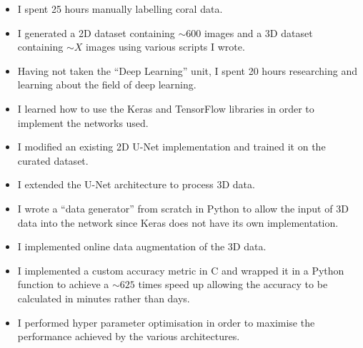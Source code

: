 \begin{itemize}
    \item I spent 25 hours manually labelling coral data.
    \item I generated a 2D dataset containing ${\sim}600$ images and a 3D dataset containing ${\sim}X$ images using various scripts I wrote.
    \item Having not taken the ``Deep Learning'' unit, I spent 20 hours researching and learning about the field of deep learning.
    \item I learned how to use the Keras and TensorFlow libraries in order to implement the networks used.
    \item I modified an existing 2D U-Net implementation and trained it on the curated dataset.
    \item I extended the U-Net architecture to process 3D data.
    \item I wrote a ``data generator'' from scratch in Python to allow the input of 3D data into the network since Keras does not have its own implementation.
    \item I implemented online data augmentation of the 3D data.
    \item I implemented a custom accuracy metric in C and wrapped it in a Python function to achieve a ${\sim}625$ times speed up allowing the accuracy to be calculated in minutes rather than days.
    \item I performed hyper parameter optimisation in order to maximise the performance achieved by the various architectures.
\end{itemize}